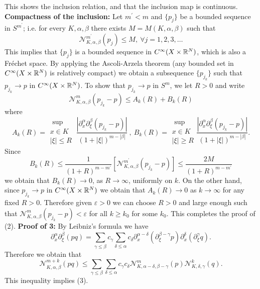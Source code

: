 \documentclass[12pt,reqno]{amsart}
\theoremstyle{plain}  %
\theoremstyle{definition}
\newcommand{\ve}{\varepsilon}
\newcommand{\nin}{\noindent}
\begin{document}
This shows the inclusion relation, and that the inclusion map is continuous.
\vskip0.1in
\nin
{\bf Compactness of the inclusion:}   Let $ m^\prime < m $ and $ \{p_j\} $ be a bounded
sequence in $ S^{m^\prime}$;  i.e. for every $ K, \alpha, \beta $ there
exists $ M = M(K, \alpha, \beta) $ such that
$$\mathcal{N}^{m^\prime}_{K, \alpha, \beta} (p_j) \le M, \ \forall j = 1, 2, 3,
\dots$$
This implies that $ \{p_j\} $ is a bounded sequence in $ C^\infty (X
\times \Bbb R^N)$, which is also a Fr\'echet space.  By applying the
Ascoli-Arzela theorem (any bounded set in $ C^\infty (X \times \Bbb
R^N) $ is relatively compact) we obtain a subsequence $ \{p_{j_k}\} $
such that $ p_{j_k} \longrightarrow p $ in $ C^\infty (X \times \Bbb
R^N)$.  To show that $ p_{j_k} \longrightarrow  p $ in $ S^m$, we let $ R
> 0 $ and write
$$\mathcal{N}^m_{K, \alpha, \beta} (p_{j_k} - p) \le A_k (R) + B_k (R)$$
where
$$A_k (R) = \substack{ \text{ sup }\\
x \in K\\
|\xi| \le R} \ \frac{ \left |\partial^\alpha_x \partial^\beta_\xi
(p_{j_k} - p) \right |}{(1 + |\xi|)^{m-|\beta|}}\ , \  B_k (R) = \substack{\text{ sup
}\\ x \in K\\
|\xi| \ge R } \frac{\left | \partial^\alpha_x \partial^\beta_\xi
(p_{j_k} - p) \right |}{(1 + |\xi|)^{m-|\beta|}}.$$
Since
$$B_k (R) \le \frac{1}{(1 + R)^{m-m^\prime}} \left [ \mathcal
N^{m^\prime}_{K, \alpha, \beta} (p_{j_k} - p) \right ] \le  \frac{  2M  }{(1
+ R)^{m-m^\prime}}$$ 
we obtain that $ B_k (R) \longrightarrow 0$, as $ R \to
\infty$, uniformly on $ k$.  On the other hand, since $ p_{j_k}
\longrightarrow p $ in $ C^\infty(X \times \Bbb R^N) $ we obtain that $
A_k (R) \longrightarrow 0 $ as $ k \to \infty $ for any fixed $ R > 0$. 
Therefore given $ \ve > 0 $ we can choose $ R > 0 $ and large enough such that
$ \mathcal N^m_{K, \alpha, \beta} (p_{j_k} - p) < \ve $ for all $ k \ge k_0 $ for
some $ k_0$.  This completes the proof of (2).
\vskip0.1in
\nin
{\bf Proof of 3:}   By  Leibniz's formula we have
$$\partial^\alpha_x \partial^\beta_\xi (pq) = \sum_{\gamma \le
\beta} c_\gamma \sum_{\delta \le \alpha} c_\delta \partial^{\alpha -
\delta}_x \left ( \partial^{\beta - \gamma}_\xi p \right )
\partial^\delta_x \left ( \partial^\gamma_\xi q \right ). $$
Therefore we obtain that
$$\mathcal N^{m+k}_{K, \alpha, \beta} (pq) \le \sum_{\gamma \le \beta}
\sum_{\delta \le \alpha} c_\gamma c_\delta \mathcal N^m_{K, \alpha -
\delta, \beta - \gamma} (p) \mathcal N^k_{K, \delta, \gamma} (q). $$
This inequality implies (3).  
\end{document}
